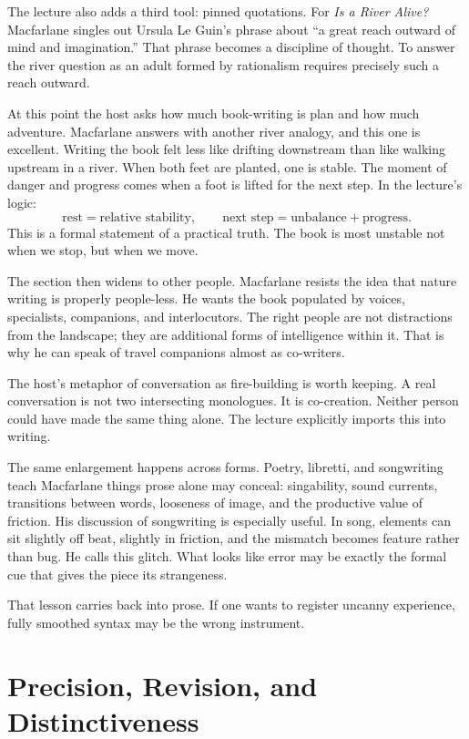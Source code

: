 The lecture also adds a third tool: pinned quotations. For \emph{Is a River Alive?} Macfarlane singles out Ursula Le Guin's phrase about ``a great reach outward of mind and imagination.'' That phrase becomes a discipline of thought. To answer the river question as an adult formed by rationalism requires precisely such a reach outward.

At this point the host asks how much book-writing is plan and how much adventure. Macfarlane answers with another river analogy, and this one is excellent. Writing the book felt less like drifting downstream than like walking upstream in a river. When both feet are planted, one is stable. The moment of danger and progress comes when a foot is lifted for the next step. In the lecture's logic:
\begin{equation}
\text{rest} = \text{relative stability},\qquad
\text{next step} = \text{unbalance} + \text{progress}.
\end{equation}
This is a formal statement of a practical truth. The book is most unstable not when we stop, but when we move.

The section then widens to other people. Macfarlane resists the idea that nature writing is properly people-less. He wants the book populated by voices, specialists, companions, and interlocutors. The right people are not distractions from the landscape; they are additional forms of intelligence within it. That is why he can speak of travel companions almost as co-writers.

The host's metaphor of conversation as fire-building is worth keeping. A real conversation is not two intersecting monologues. It is co-creation. Neither person could have made the same thing alone. The lecture explicitly imports this into writing.

The same enlargement happens across forms. Poetry, libretti, and songwriting teach Macfarlane things prose alone may conceal: singability, sound currents, transitions between words, looseness of image, and the productive value of friction. His discussion of songwriting is especially useful. In song, elements can sit slightly off beat, slightly in friction, and the mismatch becomes feature rather than bug. He calls this glitch. What looks like error may be exactly the formal cue that gives the piece its strangeness.

That lesson carries back into prose. If one wants to register uncanny experience, fully smoothed syntax may be the wrong instrument.

\section{Precision, Revision, and Distinctiveness}

